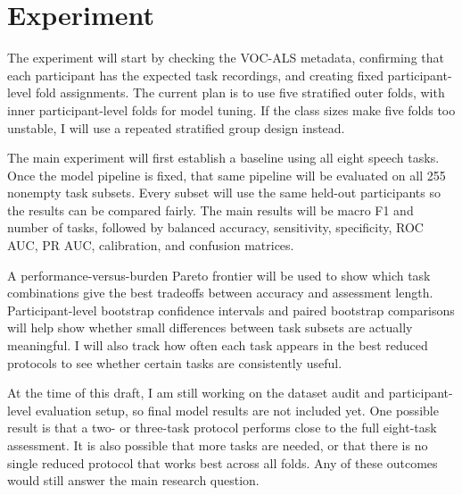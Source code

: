 \section{Experiment}

The experiment will start by checking the VOC-ALS metadata, confirming that each participant has the expected task recordings, and creating fixed participant-level fold assignments. The current plan is to use five stratified outer folds, with inner participant-level folds for model tuning. If the class sizes make five folds too unstable, I will use a repeated stratified group design instead.

The main experiment will first establish a baseline using all eight speech tasks. Once the model pipeline is fixed, that same pipeline will be evaluated on all 255 nonempty task subsets. Every subset will use the same held-out participants so the results can be compared fairly. The main results will be macro F1 and number of tasks, followed by balanced accuracy, sensitivity, specificity, ROC AUC, PR AUC, calibration, and confusion matrices.

A performance-versus-burden Pareto frontier will be used to show which task combinations give the best tradeoffs between accuracy and assessment length. Participant-level bootstrap confidence intervals and paired bootstrap comparisons will help show whether small differences between task subsets are actually meaningful. I will also track how often each task appears in the best reduced protocols to see whether certain tasks are consistently useful.

At the time of this draft, I am still working on the dataset audit and participant-level evaluation setup, so final model results are not included yet. One possible result is that a two- or three-task protocol performs close to the full eight-task assessment. It is also possible that more tasks are needed, or that there is no single reduced protocol that works best across all folds. Any of these outcomes would still answer the main research question.

